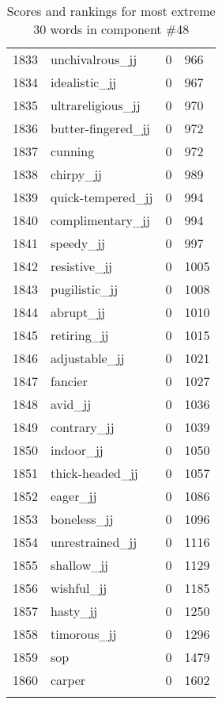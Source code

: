 \begin{longtable}[!htbp]{| rlr@{.}l |}
    1833 & unchivalrous\_jj & 0 & 966 \\
    1834 & idealistic\_jj & 0 & 967 \\
    1835 & ultrareligious\_jj & 0 & 970 \\
    1836 & butter-fingered\_jj & 0 & 972 \\
    1837 & cunning & 0 & 972 \\
    1838 & chirpy\_jj & 0 & 989 \\
    1839 & quick-tempered\_jj & 0 & 994 \\
    1840 & complimentary\_jj & 0 & 994 \\
    1841 & speedy\_jj & 0 & 997 \\
    1842 & resistive\_jj & 0 & 1005 \\
    1843 & pugilistic\_jj & 0 & 1008 \\
    1844 & abrupt\_jj & 0 & 1010 \\
    1845 & retiring\_jj & 0 & 1015 \\
    1846 & adjustable\_jj & 0 & 1021 \\
    1847 & fancier & 0 & 1027 \\
    1848 & avid\_jj & 0 & 1036 \\
    1849 & contrary\_jj & 0 & 1039 \\
    1850 & indoor\_jj & 0 & 1050 \\
    1851 & thick-headed\_jj & 0 & 1057 \\
    1852 & eager\_jj & 0 & 1086 \\
    1853 & boneless\_jj & 0 & 1096 \\
    1854 & unrestrained\_jj & 0 & 1116 \\
    1855 & shallow\_jj & 0 & 1129 \\
    1856 & wishful\_jj & 0 & 1185 \\
    1857 & hasty\_jj & 0 & 1250 \\
    1858 & timorous\_jj & 0 & 1296 \\
    1859 & sop & 0 & 1479 \\
    1860 & carper & 0 & 1602 \\
    \hline
    \caption{Scores and rankings for most extreme 30 words in component \#48} \\
\end{longtable}
